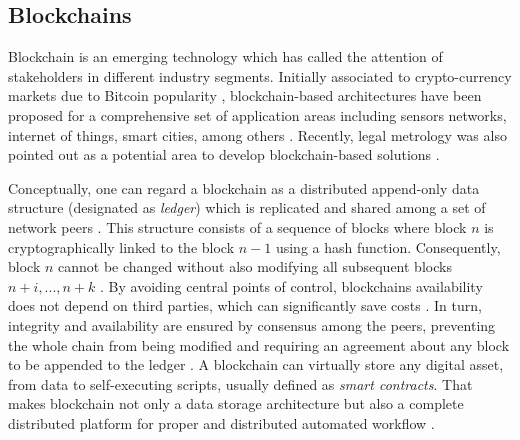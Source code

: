 \documentclass[sigplan]{acmart}
\begin{document}
\subsection{Blockchains}
Blockchain is an emerging technology which has called the attention of stakeholders in different industry segments. 
Initially associated to crypto-currency markets due to Bitcoin popularity \cite{Zheng2017}, blockchain-based architectures have been proposed for a comprehensive set of application areas including sensors networks, internet of things, smart cities, among others \cite{Zheng2017,Androulaki2018}.
Recently, legal metrology was also pointed out as a potential area to develop blockchain-based solutions \cite{Peters2018,MeloJr.2019}.

Conceptually, one can regard a blockchain as a distributed append-only data structure (designated as \emph{ledger}) which is replicated and shared among a set of network peers \cite{Christidis2016}. 
This structure consists of a sequence of blocks where block $n$ is cryptographically linked to the block $n-1$ using a hash function. 
Consequently, block $n$ cannot be changed without also modifying all subsequent blocks $n + i, ..., n + k$ \cite{Sousa2018}. 
By avoiding central points of control, blockchains availability does not depend on third parties, which can significantly save costs \cite{Zheng2017}.
In turn, integrity and availability are ensured by consensus among the peers, preventing the whole chain from being modified and requiring an agreement about any block to be appended to the ledger \cite{Sousa2018,Vukolic2016}. 
A blockchain can virtually store any digital asset, from data to self-executing scripts, usually defined as \emph{smart contracts}. 
That makes blockchain not only a data storage architecture but also a complete distributed platform for proper and distributed automated workflow \cite{Christidis2016}. 
\end{document}

